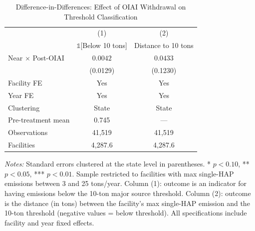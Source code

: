 \begin{table}[H]
\centering
\caption{Difference-in-Differences: Effect of OIAI Withdrawal on Threshold Classification}
\label{tab:did}
\begin{threeparttable}
\begin{tabular}{lcc}
\toprule
 & (1) & (2) \\
 & $\mathbb{1}$[Below 10 tons] & Distance to 10 tons \\
\midrule
Near $\times$ Post-OIAI & $0.0042$ & $0.0433$ \\
 & (0.0129) & (0.1230) \\
\midrule
Facility FE & Yes & Yes \\
Year FE & Yes & Yes \\
Clustering & State & State \\
Pre-treatment mean & 0.745 & --- \\
Observations & 41,519 & 41,519 \\
Facilities & 4,287.6 & 4,287.6 \\
\bottomrule
\end{tabular}
\begin{tablenotes}[flushleft]
\small
\item \textit{Notes:} Standard errors clustered at the state level in parentheses. * $p<0.10$, ** $p<0.05$, *** $p<0.01$. Sample restricted to facilities with max single-HAP emissions between 3 and 25 tons/year. Column (1): outcome is an indicator for having emissions below the 10-ton major source threshold. Column (2): outcome is the distance (in tons) between the facility's max single-HAP emission and the 10-ton threshold (negative values = below threshold). All specifications include facility and year fixed effects.
\end{tablenotes}
\end{threeparttable}
\end{table}

